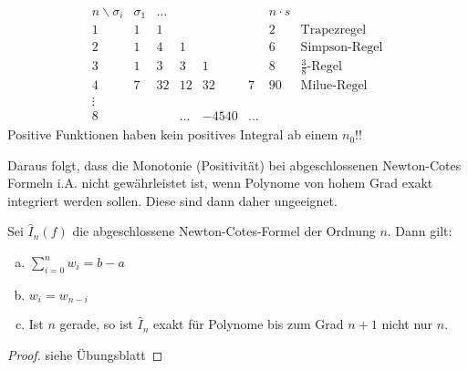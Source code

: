 \documentclass[ngerman,fontsize=11pt, paper=a4, parskip=half, titlepage=true, toc=bib]{scrbook}
\begin{document}
\begin{align*}
  \begin{array}{cccccccl}
    n\backslash \sigma_i &\sigma_1&\dots&&&& n\cdot s\\
    1 & 1&1&&&&2& \text{Trapezregel}\\
    2&1&4&1&&&6 & \text{Simpson-Regel}\\
    3&1&3&3&1&&8& \text{$\frac{3}{8}$-Regel}\\
    4&7&32&12&32&7&90 & \text{Milue-Regel}\\
    \vdots\\
    8&&&\dots &-4540&\dots
  \end{array}
\end{align*}
Positive Funktionen haben kein positives Integral ab einem $n_0$!!




Daraus folgt, dass die Monotonie (Positivität) 
bei abgeschlossenen Newton-Cotes Formeln i.A. nicht gewährleistet ist,
wenn Polynome von hohem Grad exakt integriert werden sollen.
Diese sind dann daher ungeeignet.


\begin{Satze}\label{7.2.5}
  Sei $\hat{I}_n(f) $ die abgeschlossene Newton-Cotes-Formel
  der Ordnung $n$.
  Dann gilt:
  \begin{enumerate}[a)]
  \item $\sum_{i=0}^nw_i= b-a$
  \item $w_i=w_{n-i}$
  \item Ist $n$ gerade, so ist $\hat{I}_n$ exakt für Polynome bis zum
    Grad $n+1$ nicht nur $n$.
  \end{enumerate}

  \begin{proof} siehe Übungsblatt \end{proof}
\end{Satze}
\end{document}
